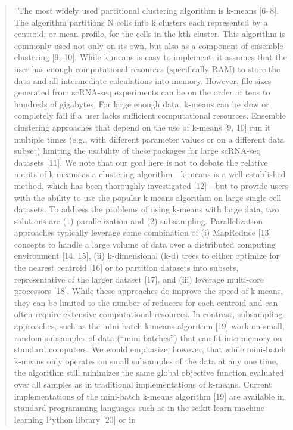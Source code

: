 \documentclass[]{tufte-book}
\begin{document}
\begin{quote}
``The most widely used partitional clustering algorithm is k-means {[}6--8{]}. The
algorithm partitions N cells into k clusters each represented by a centroid, or
mean profile, for the cells in the kth cluster. This algorithm is commonly used
not only on its own, but also as a component of ensemble clustering {[}9, 10{]}.
While k-means is easy to implement, it assumes that the user has enough
computational resources (specifically RAM) to store the data and all
intermediate calculations into memory. However, file sizes generated from
scRNA-seq experiments can be on the order of tens to hundreds of gigabytes. For
large enough data, k-means can be slow or completely fail if a user lacks
sufficient computational resources. Ensemble clustering approaches that depend
on the use of k-means {[}9, 10{]} run it multiple times (e.g., with different
parameter values or on a different data subset) limiting the usability of these
packages for large scRNA-seq datasets {[}11{]}. We note that our goal here is not to
debate the relative merits of k-means as a clustering algorithm---k-means is a
well-established method, which has been thoroughly investigated {[}12{]}---but to
provide users with the ability to use the popular k-means algorithm on large
single-cell datasets. To address the problems of using k-means with large data,
two solutions are (1) parallelization and (2) subsampling. Parallelization
approaches typically leverage some combination of (i) MapReduce {[}13{]} concepts to
handle a large volume of data over a distributed computing environment {[}14, 15{]},
(ii) k-dimensional (k-d) trees to either optimize for the nearest centroid {[}16{]}
or to partition datasets into subsets, representative of the larger dataset
{[}17{]}, and (iii) leverage multi-core processors {[}18{]}. While these approaches do
improve the speed of k-means, they can be limited to the number of reducers for
each centroid and can often require extensive computational resources. In
contrast, subsampling approaches, such as the mini-batch k-means algorithm {[}19{]}
work on small, random subsamples of data (``mini batches'') that can fit into
memory on standard computers. We would emphasize, however, that while mini-batch
k-means only operates on small subsamples of the data at any one time, the
algorithm still minimizes the same global objective function evaluated over all
samples as in traditional implementations of k-means. Current implementations of
the mini-batch k-means algorithm {[}19{]} are available in standard programming
languages such as in the scikit-learn machine learning Python library {[}20{]} or in

\end{quote}
\end{document}
